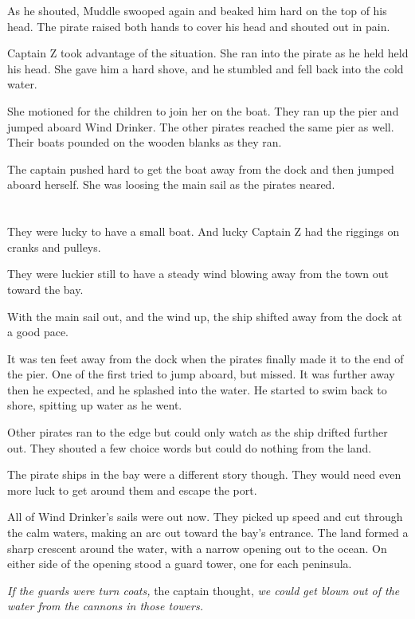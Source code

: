 \documentclass[12pt]{extbook}
\begin{document}
  As he shouted, Muddle swooped again and beaked him hard on the top of
  his head. The pirate raised both hands to cover his head and shouted out
  in pain.
  
  Captain Z took advantage of the situation. She ran into the pirate as he
  held held his head. She gave him a hard shove, and he stumbled and fell
  back into the cold water.
  
  She motioned for the children to join her on the boat. They ran up the
  pier and jumped aboard Wind Drinker. The other pirates reached the same
  pier as well. Their boats pounded on the wooden blanks as they ran.
  
  The captain pushed hard to get the boat away from the dock and then
  jumped aboard herself. She was loosing the main sail as the pirates
  neared.
  
  \section{}\label{section-34}
  
  They were lucky to have a small boat. And lucky Captain Z had the
  riggings on cranks and pulleys.
  
  They were luckier still to have a steady wind blowing away from the town
  out toward the bay.
  
  With the main sail out, and the wind up, the ship shifted away from the
  dock at a good pace.
  
  It was ten feet away from the dock when the pirates finally made it to
  the end of the pier. One of the first tried to jump aboard, but missed.
  It was further away then he expected, and he splashed into the water. He
  started to swim back to shore, spitting up water as he went.
  
  Other pirates ran to the edge but could only watch as the ship drifted
  further out. They shouted a few choice words but could do nothing from
  the land.
  
  The pirate ships in the bay were a different story though. They would
  need even more luck to get around them and escape the port.
  
  All of Wind Drinker's sails were out now. They picked up speed and cut
  through the calm waters, making an arc out toward the bay's entrance.
  The land formed a sharp crescent around the water, with a narrow opening
  out to the ocean. On either side of the opening stood a guard tower, one
  for each peninsula.
  
  \emph{If the guards were turn coats,} the captain thought, \emph{we
  could get blown out of the water from the cannons in those towers.}
  
\end{document}
